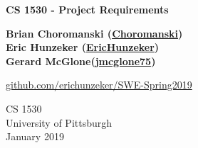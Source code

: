 \documentclass{article}
\begin{document}
\begin{titlepage}
    \begin{center}
        \vspace*{1cm}
        
        \LARGE
        \textbf{CS 1530 - Project Requirements}
        
        \vspace{1.5cm}
        
        \textbf{Brian Choromanski (\href{https://github.com/Choromanski}{\faGithub \space Choromanski})\\Eric Hunzeker (\href{https://github.com/erichunzeker}{\faGithub \space EricHunzeker})\\Gerard McGlone(\href{https://github.com/jmcglone75}{\faGithub \space jmcglone75})}
        
        \vfill
        
        \href{https://github.com/erichunzeker/SWE-Spring2019}{\faGithub \space github.com/erichunzeker/SWE-Spring2019}
        
        \vspace{0.8cm}
        
        \normalsize
        CS 1530\\
        University of Pittsburgh\\
        January 2019
        
    \end{center}
\end{titlepage}

\newpage

\end{document}
